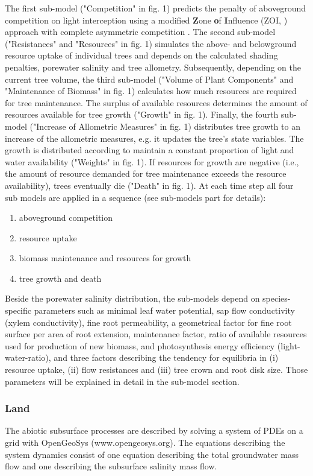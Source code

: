 The first sub-model ("Competition" in fig. 1) predicts the penalty of aboveground competition on light interception using a modified \textbf{Z}one \textbf{o}f \textbf{I}nfluence (ZOI, \citet{Gates1978}) approach with complete asymmetric competition \citep{Schwinning1998}.
The second sub-model ("Resistances" and "Resources" in fig. 1) simulates the above- and belowground resource uptake of individual trees and depends on the calculated shading penalties, porewater salinity and tree allometry.
Subsequently, depending on the current tree volume, the third sub-model ("Volume of Plant Components" and "Maintenance of Biomass" in fig. 1) calculates how much resources are required for tree maintenance.
The surplus of available resources determines the amount of resources available for tree growth ("Growth" in fig. 1). 
Finally, the fourth sub-model ("Increase of Allometric Measures" in fig. 1) distributes tree growth to an increase of the allometric measures, e.g. it updates the tree's state variables.
The growth is distributed according to maintain a constant proportion of light and water availability ("Weights" in fig. 1).
If resources for growth are negative (i.e., the amount of resource demanded for tree maintenance exceeds the resource availability), trees eventually die ("Death" in fig. 1).
At each time step all four sub models are applied in a sequence (see sub-models part for details): 
\begin{enumerate}
\item aboveground competition
\item resource uptake
\item biomass maintenance and resources for growth
\item tree growth and death
\end{enumerate}
Beside the porewater salinity distribution, the sub-models depend on species-specific parameters such as minimal leaf water potential, sap flow conductivity (xylem conductivity), fine root permeability, a geometrical factor for fine root surface per area of root extension, maintenance factor, ratio of available resources used for production of new biomass, and photosynthesis energy efficiency (light-water-ratio), and three factors describing the tendency for equilibria in (i) resource uptake, (ii) flow resistances and (iii) tree crown and root disk size.
Those parameters will be explained in detail in the sub-model section.
\subsubsection{Land}
The abiotic subsurface processes are described by solving a system of PDEs on a grid with OpenGeoSys (www.opengeosys.org).
The equations describing the system dynamics consist of one equation describing the total groundwater mass flow and one describing the subsurface salinity mass flow.

